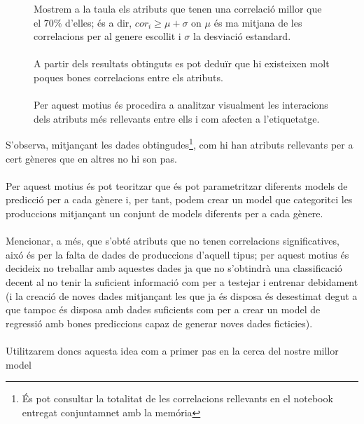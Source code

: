 \documentclass[a4paper, 11pt]{article}
\begin{document}
\begin{figure}[h]
\begin{minipage}{10cm}
\end{minipage} %
\hspace{2em}
\begin{minipage}{4cm} %
Mostrem a la taula els atributs que tenen una correlació millor que el $ 70\% $ d'elles; és a dir, $ cor_i \geq \mu + \sigma$ on $\mu$ és ma mitjana de les correlacions per al genere escollit i $\sigma$ la desviació estandard.\\\\
A partir dels resultats obtinguts es pot deduïr que hi existeixen molt poques bones correlacions entre els atributs. \\\\
Per aquest motius és procedira a analitzar visualment les interacions dels atributs més rellevants entre ells i com afecten a l'etiquetatge.

\end{minipage} %
\end{figure} %
\hspace{-1.5em}S'observa, mitjançant les dades obtingudes\footnote{És pot consultar la totalitat de les correlacions rellevants en el notebook entregat conjuntamnet amb la memória}, com hi han atributs rellevants per a cert gèneres que en altres no hi son pas. \\\\ Per aquest motius és pot teoritzar que és pot parametritzar diferents models de predicció per a cada gènere i, per tant, podem crear un model que categoritci les produccions mitjançant un conjunt de models diferents per a cada gènere.\\\\
Mencionar, a més, que s'obté atributs que no tenen correlacions significatives, aixó és per la falta de dades de produccions d'aquell tipus; per aquest motius és decideix no treballar amb aquestes dades ja que no s'obtindrà una classificació decent al no tenir la suficient informació com per a testejar i entrenar debidament (i la creació de noves dades mitjançant les que ja és disposa és desestimat degut a que tampoc és disposa amb dades suficients com per a crear un model de regressió amb bones prediccions capaz de generar noves dades ficticies). \\\\Utilitzarem doncs aquesta idea com a primer pas en la cerca del nostre millor model
\newpage
\end{document}
